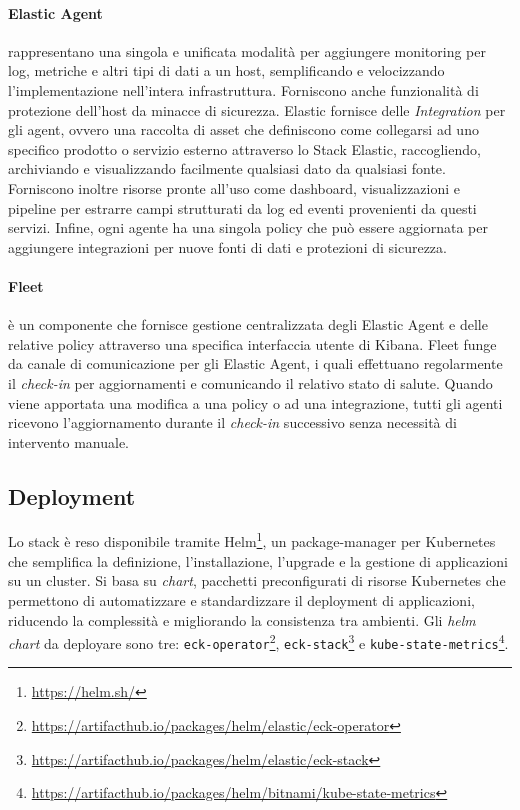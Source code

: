 \paragraph{Elastic Agent}
rappresentano una singola e unificata modalità per aggiungere monitoring per log, metriche e altri tipi di dati a un host, semplificando e velocizzando l'implementazione nell'intera infrastruttura. Forniscono anche funzionalità di protezione dell'host da minacce di sicurezza.
Elastic fornisce delle \emph{Integration} per gli agent, ovvero una raccolta di asset che definiscono come collegarsi ad uno specifico prodotto o servizio esterno attraverso lo Stack Elastic, raccogliendo, archiviando e visualizzando facilmente qualsiasi dato da qualsiasi fonte. Forniscono inoltre risorse pronte all'uso come dashboard, visualizzazioni e pipeline per estrarre campi strutturati da log ed eventi provenienti da questi servizi.
Infine, ogni agente ha una singola policy che può essere aggiornata per aggiungere integrazioni per nuove fonti di dati e protezioni di sicurezza.

\paragraph{Fleet}
è un componente che fornisce gestione centralizzata degli Elastic Agent e delle relative policy attraverso una specifica interfaccia utente di Kibana.
Fleet funge da canale di comunicazione per gli Elastic Agent, i quali effettuano regolarmente il \textit{check-in} per aggiornamenti e comunicando il relativo stato di salute. Quando viene apportata una modifica a una policy o ad una integrazione, tutti gli agenti ricevono l'aggiornamento durante il \textit{check-in} successivo senza necessità di intervento manuale.

\subsection{Deployment}
Lo stack è reso disponibile tramite Helm\footnote{\url{https://helm.sh/}}, un package-manager per Kubernetes che semplifica la definizione, l'installazione, l'upgrade e la gestione di applicazioni su un cluster. Si basa su \emph{chart}, pacchetti preconfigurati di risorse Kubernetes che permettono di automatizzare e standardizzare il deployment di applicazioni, riducendo la complessità e migliorando la consistenza tra ambienti.
Gli \emph{helm chart} da deployare sono tre: \texttt{eck-operator}\footnote{\url{https://artifacthub.io/packages/helm/elastic/eck-operator}}, \texttt{eck-stack}\footnote{\url{https://artifacthub.io/packages/helm/elastic/eck-stack}} e \texttt{kube-state-metrics}\footnote{\url{https://artifacthub.io/packages/helm/bitnami/kube-state-metrics}}.

